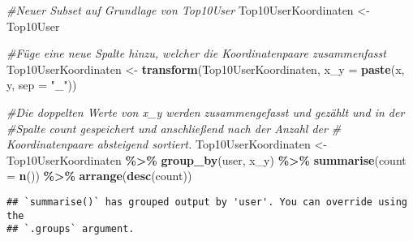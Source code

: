 \documentclass[
]{article}
\newenvironment{Shaded}{\begin{snugshade}}{\end{snugshade}}
\newcommand{\AttributeTok}[1]{\textcolor[rgb]{0.13,0.29,0.53}{#1}}
\newcommand{\CommentTok}[1]{\textcolor[rgb]{0.56,0.35,0.01}{\textit{#1}}}
\newcommand{\FunctionTok}[1]{\textcolor[rgb]{0.13,0.29,0.53}{\textbf{#1}}}
\newcommand{\NormalTok}[1]{#1}
\newcommand{\OtherTok}[1]{\textcolor[rgb]{0.56,0.35,0.01}{#1}}
\newcommand{\SpecialCharTok}[1]{\textcolor[rgb]{0.81,0.36,0.00}{\textbf{#1}}}
\newcommand{\StringTok}[1]{\textcolor[rgb]{0.31,0.60,0.02}{#1}}
\begin{document}
\begin{Shaded}
\begin{Highlighting}[]
\CommentTok{\#Neuer Subset auf Grundlage von Top10User}
\NormalTok{Top10UserKoordinaten }\OtherTok{\textless{}{-}}\NormalTok{ Top10User}

\CommentTok{\#Füge eine neue Spalte hinzu, welcher die Koordinatenpaare zusammenfasst}
\NormalTok{Top10UserKoordinaten }\OtherTok{\textless{}{-}} \FunctionTok{transform}\NormalTok{(Top10UserKoordinaten, }\AttributeTok{x\_y =} \FunctionTok{paste}\NormalTok{(x, y, }\AttributeTok{sep =} \StringTok{"\_"}\NormalTok{))}

\CommentTok{\#Die doppelten Werte von x\_y werden zusammengefasst und gezählt und in der }
\CommentTok{\#Spalte count gespeichert und anschließend nach der Anzahl der }
\CommentTok{\# Koordinatenpaare absteigend sortiert.}
\NormalTok{Top10UserKoordinaten }\OtherTok{\textless{}{-}}\NormalTok{ Top10UserKoordinaten }\SpecialCharTok{\%\textgreater{}\%} \FunctionTok{group\_by}\NormalTok{(user, x\_y) }\SpecialCharTok{\%\textgreater{}\%} 
  \FunctionTok{summarise}\NormalTok{(}\AttributeTok{count =} \FunctionTok{n}\NormalTok{()) }\SpecialCharTok{\%\textgreater{}\%} \FunctionTok{arrange}\NormalTok{(}\FunctionTok{desc}\NormalTok{(count))}
\end{Highlighting}
\end{Shaded}

\begin{verbatim}
## `summarise()` has grouped output by 'user'. You can override using the
## `.groups` argument.
\end{verbatim}
\end{document}
